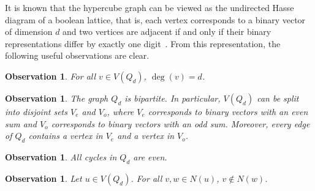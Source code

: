 \documentclass[twoside, 12pt]{article}
\newtheorem{observation}[theorem]{Observation}
\theoremstyle{definition}
\renewcommand\deg[1]{\operatorname{deg}\left(#1\right)}
\begin{document}
It is known that the hypercube graph can be viewed as the undirected Hasse diagram of a boolean lattice, that is, each vertex corresponds to a binary vector of dimension $d$ and two vertices are adjacent if and only if their binary representations differ by exactly one digit~\cite{Foldes1977}. 
From this representation, the following useful observations are clear.
\begin{observation}\label{obs:dreg}
For all $v\in V(Q_{d})$, $\deg{v}=d$. 
\end{observation}
\begin{observation}\label{obs:bipartite}
The graph $Q_{d}$ is bipartite.
In particular, $V(Q_{d})$ can be split into disjoint sets $V_{e}$ and $V_{o}$, where $V_{e}$ corresponds to binary vectors with an even sum and $V_{o}$ corresponds to binary vectors with an odd sum.
Moreover, every edge of $Q_{d}$ contains a vertex in $V_{e}$ and a vertex in $V_{o}$.
\end{observation}
\begin{observation}\label{obs:cycles}
All cycles in $Q_{d}$ are even. 
\end{observation}
\begin{observation}\label{obs:neighbors}
Let $u\in V(Q_{d})$.
For all $v,w\in N(u)$, $v\notin N(w)$. 
\end{observation}
\end{document}
